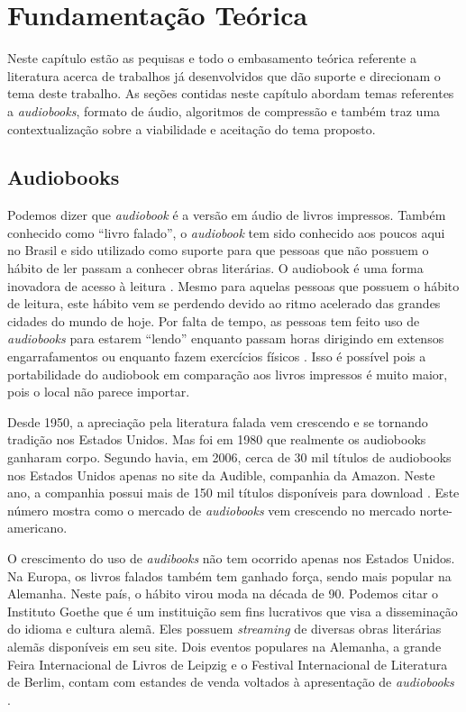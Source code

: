 \chapter[Fundamentação Teórica]{Fundamentação Teórica}\label{cap3}

Neste capítulo estão as pequisas e todo o embasamento teórica referente a literatura acerca de trabalhos já desenvolvidos que dão suporte e direcionam o tema deste trabalho. As seções contidas neste capítulo abordam temas referentes a \textit{audiobooks}, formato de áudio, algoritmos de compressão e também traz uma contextualização sobre a viabilidade e aceitação do tema proposto.

\section{Audiobooks}

Podemos dizer que \textit{audiobook} é a versão em áudio de livros impressos. Também conhecido como ``livro falado'', o \textit{audiobook} tem sido conhecido aos poucos aqui no Brasil e sido utilizado como suporte para que pessoas que não possuem o hábito de ler passam a conhecer obras literárias. O audiobook é uma forma inovadora de acesso à leitura \cite{audiobooksuporte}. Mesmo para aquelas pessoas que possuem o hábito de leitura, este hábito vem se perdendo devido ao ritmo acelerado das grandes cidades do mundo de hoje. Por falta de tempo, as pessoas tem feito uso de \textit{audiobooks} para estarem ``lendo'' enquanto passam horas dirigindo em extensos engarrafamentos ou enquanto fazem exercícios físicos \cite{audiobookinovacao}. Isso é possível pois a portabilidade do audiobook em comparação aos livros impressos é muito maior, pois o local não parece importar.

Desde 1950, a apreciação pela literatura falada vem crescendo e se tornando tradição nos Estados Unidos. Mas foi em 1980 que realmente os audiobooks ganharam corpo. Segundo \cite{teixeira} havia, em 2006, cerca de 30 mil títulos de audiobooks nos Estados Unidos apenas no site da Audible, companhia da Amazon. Neste ano, a companhia possui mais de 150 mil títulos disponíveis para download \cite{audible}. Este número mostra como o mercado de \textit{audiobooks} vem crescendo no mercado norte-americano.

O crescimento do uso de \textit{audibooks} não tem ocorrido apenas nos Estados Unidos. Na Europa, os livros falados também tem ganhado força, sendo mais popular na Alemanha. Neste país, o hábito virou moda na década de 90. Podemos citar o Instituto Goethe que é um instituição sem fins lucrativos que visa a disseminação do idioma e cultura alemã. Eles possuem \textit{streaming} de diversas obras literárias alemãs disponíveis em seu site. Dois eventos populares na Alemanha, a grande Feira Internacional de Livros de Leipzig e o Festival Internacional de Literatura de Berlim, contam com estandes de venda voltados à apresentação de \textit{audiobooks} \cite{dw}.

